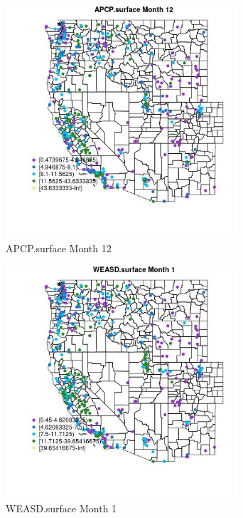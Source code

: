 \clearpage 

\begin{figure} 
\centering  
\includegraphics[width=0.77\textwidth]{Code_Outputs/ML_input_report_ML_input_PM25_Step5_part_d_de_duplicated_aves_ML_input_MapObsMo12APCPsurface.jpg} 
\caption{\label{fig:ML_input_report_ML_input_PM25_Step5_part_d_de_duplicated_aves_ML_inputMapObsMo12APCPsurface}APCP.surface Month 12} 
\end{figure} 
 

\begin{figure} 
\centering  
\includegraphics[width=0.77\textwidth]{Code_Outputs/ML_input_report_ML_input_PM25_Step5_part_d_de_duplicated_aves_ML_input_MapObsMo1WEASDsurface.jpg} 
\caption{\label{fig:ML_input_report_ML_input_PM25_Step5_part_d_de_duplicated_aves_ML_inputMapObsMo1WEASDsurface}WEASD.surface Month 1} 
\end{figure} 
 

